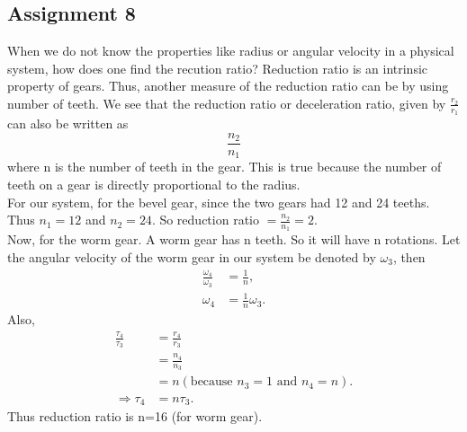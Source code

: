 \documentclass[12pt,a4paper]{report}
\begin{document}
\subsection{\textbf{Assignment 8}}
When we do not know the properties like radius or angular velocity in a physical system, how does one find the recution 
ratio? Reduction ratio is an intrinsic property of gears. Thus, another measure of the reduction ratio can be by using number 
of teeth. We see that the reduction ratio or deceleration ratio, given by \(\frac{r_2}{r_1}\) can also be written as 
\[\frac{n_2}{n_1}\] where n is the number of teeth in the gear. 
This is true because the number of teeth on a gear is directly proportional to the radius. \\
For our system, for the bevel gear, since the two gears had 12 and 24 teeths. Thus \(n_1=12\) and \(n_2=24\). So 
reduction ratio \(= \frac{n_2}{n_1}=2\).\\
Now, for the worm gear. A worm gear has n teeth. So it will have n rotations. 
Let the angular velocity of the worm gear in our system be denoted by \(\omega_3\), then 
\begin{align}
    \frac{\omega_4}{\omega_3}&=\frac{1}{n},\\
    \omega_4&=\frac{1}{n}\omega_3.
\end{align}
Also, 
\begin{align}
    \frac{\tau_4}{\tau_3}&=\frac{r_4}{r_3}\\
                         &=\frac{n_4}{n_3}\\
                         &=n (\text{because }n_3=1\text{ and }n_4=n).\\
    \Rightarrow \tau_4 &= n\tau_3.
\end{align}
Thus reduction ratio is n=16 (for worm gear).
\end{document}
